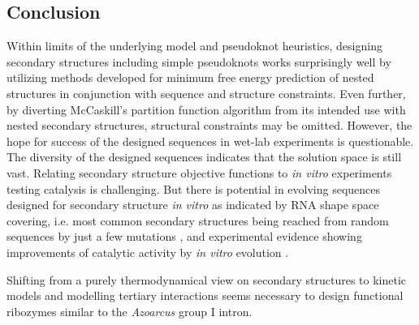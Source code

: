 \documentclass[../../master.tex]{subfiles}
\begin{document}
\subsection{Conclusion}
\label{sub:discussion:conclusion}




Within limits of the underlying model and pseudoknot heuristics, designing secondary structures including simple pseudoknots works surprisingly well by utilizing methods developed for minimum free energy prediction of nested structures in conjunction with sequence and structure constraints.
Even further, by diverting McCaskill's partition function algorithm from its intended use with nested secondary structures, structural constraints may be omitted.
However, the hope for success of the designed sequences in wet-lab experiments is questionable.
The diversity of the designed sequences indicates that the solution space is still vast.
Relating secondary structure objective functions to \textit{in vitro} experiments testing catalysis is challenging.
But there is potential in evolving sequences designed for secondary structure \textit{in vitro} as indicated by RNA shape space covering, i.e. most common secondary structures being reached from random sequences by just a few mutations \parencite{schuster_sequences_1994, reidys_generic_1997}, and experimental evidence showing improvements of catalytic activity by \textit{in vitro} evolution \parencite{ameta_next-generation_2014}.

Shifting from a purely thermodynamical view on secondary structures to kinetic models and modelling tertiary interactions seems necessary to design functional ribozymes similar to the \textit{Azoarcus} group I intron.
\end{document}
